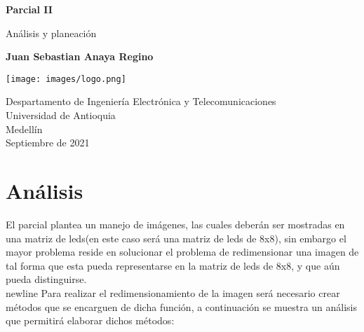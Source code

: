 \documentclass{article}
\begin{document}
\begin{titlepage}
    \begin{center}
        \vspace*{1cm}
            
        \Huge
        \textbf{Parcial II}
            
        \vspace{0.5cm}
        \LARGE
        Análisis y planeación
            
        \vspace{1.5cm}
            
        \textbf{Juan Sebastian Anaya Regino}
            
        \vspace{0.9cm}
        \centering
        \texttt{[image: images/logo.png]}
            
        \vfill
            
        \vspace{0.8cm}
            
        \Large
        Despartamento de Ingeniería Electrónica y Telecomunicaciones\\
        Universidad de Antioquia\\
        Medellín\\
        Septiembre de 2021
            
    \end{center}
\end{titlepage}

\section{Análisis}
El parcial plantea un manejo de imágenes, las cuales deberán ser mostradas en una matriz de leds(en este caso será una matriz de leds de 8x8), sin embargo el mayor problema reside en solucionar el problema de redimensionar una imagen de tal forma que esta pueda representarse en la matriz de leds de 8x8, y que aún pueda distinguirse. \\newline
Para realizar el redimensionamiento de la imagen será necesario crear métodos que se encarguen de dicha función, a continuación se muestra un análisis que permitirá elaborar dichos métodos:
\end{document}

